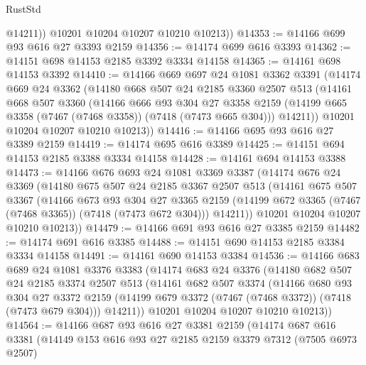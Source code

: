 \begin{lexlean}{RustStd}
\begin{coremodule}
            @14211))
        @10201
        @10204
        @10207
        @10210
        @10213))
@14353 := @14166 @699 @93 @616 @27 @3393 @2159
@14356 := @14174 @699 @616 @3393
@14362 := @14151 @698 @14153 @2185 @3392 @3334 @14158
@14365 := @14161 @698 @14153 @3392
@14410 := @14166
    @669
    @697
    @24
    @1081
    @3362
    @3391
    (@14174
      @669
      @24
      @3362
      (@14180
        @668
        @507
        @24
        @2185
        @3360
        @2507
        @513
        (@14161
          @668
          @507
          @3360
          (@14166
            @666
            @93
            @304
            @27
            @3358
            @2159
            (@14199 @665 @3358 (@7467 (@7468 @3358)) (@7418 (@7473 @665 @304)))
            @14211))
        @10201
        @10204
        @10207
        @10210
        @10213))
@14416 := @14166 @695 @93 @616 @27 @3389 @2159
@14419 := @14174 @695 @616 @3389
@14425 := @14151 @694 @14153 @2185 @3388 @3334 @14158
@14428 := @14161 @694 @14153 @3388
@14473 := @14166
    @676
    @693
    @24
    @1081
    @3369
    @3387
    (@14174
      @676
      @24
      @3369
      (@14180
        @675
        @507
        @24
        @2185
        @3367
        @2507
        @513
        (@14161
          @675
          @507
          @3367
          (@14166
            @673
            @93
            @304
            @27
            @3365
            @2159
            (@14199 @672 @3365 (@7467 (@7468 @3365)) (@7418 (@7473 @672 @304)))
            @14211))
        @10201
        @10204
        @10207
        @10210
        @10213))
@14479 := @14166 @691 @93 @616 @27 @3385 @2159
@14482 := @14174 @691 @616 @3385
@14488 := @14151 @690 @14153 @2185 @3384 @3334 @14158
@14491 := @14161 @690 @14153 @3384
@14536 := @14166
    @683
    @689
    @24
    @1081
    @3376
    @3383
    (@14174
      @683
      @24
      @3376
      (@14180
        @682
        @507
        @24
        @2185
        @3374
        @2507
        @513
        (@14161
          @682
          @507
          @3374
          (@14166
            @680
            @93
            @304
            @27
            @3372
            @2159
            (@14199 @679 @3372 (@7467 (@7468 @3372)) (@7418 (@7473 @679 @304)))
            @14211))
        @10201
        @10204
        @10207
        @10210
        @10213))
@14564 := @14166
    @687
    @93
    @616
    @27
    @3381
    @2159
    (@14174
      @687
      @616
      @3381
      (@14149
        @153
        @616
        @93
        @27
        @2185
        @2159
        @3379
        @7312
        (@7505 @6973 @2507)

\end{coremodule}
\end{lexlean}
